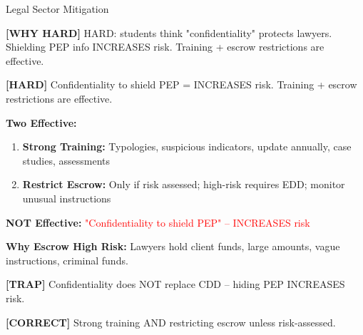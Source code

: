 \documentclass[6pt,aspectratio=169,fontsize=5pt]{beamer}
\renewcommand{\tiny}{\fontsize{3.5pt}{4.5pt}\selectfont}
\renewcommand{\normalsize}{\fontsize{7.5pt}{8.5pt}\selectfont}
\newcommand{\trap}[1]{%
	\begin{block}{\textcolor{redtrap}{\textbf{[TRAP]}}}
		\textcolor{redtrap}{\tiny #1}
	\end{block}
}
\newcommand{\correct}[1]{%
	\begin{block}{\textcolor{greencorrect}{\textbf{[CORRECT]}}}
		\textcolor{greencorrect}{\tiny #1}
	\end{block}
}
\newcommand{\hard}[1]{%
	\begin{block}{\textcolor{hardcolor}{\textbf{[HARD]}}}
		\textcolor{hardcolor}{\tiny #1}
	\end{block}
}
\newcommand{\hardexplain}[1]{%
	\begin{block}{\textcolor{orangehard}{\textbf{[WHY HARD]}}}
		\textcolor{orangehard}{\tiny #1}
	\end{block}
}
\begin{document}
	\begin{frame}{\normalsize Legal Sector Mitigation}
		
		\hardexplain{HARD: students think "confidentiality" protects lawyers. Shielding PEP info INCREASES risk. Training + escrow restrictions are effective.}
		
		\hard{Confidentiality to shield PEP = INCREASES risk. Training + escrow restrictions are effective.}
		
		\textbf{Two Effective:}
		\begin{enumerate}
			\item \textbf{Strong Training:} Typologies, suspicious indicators, update annually, case studies, assessments
			\item \textbf{Restrict Escrow:} Only if risk assessed; high-risk requires EDD; monitor unusual instructions
		\end{enumerate}
		
		\textbf{NOT Effective:} \textcolor{red}{"Confidentiality to shield PEP" -- INCREASES risk}
		
		\textbf{Why Escrow High Risk:} Lawyers hold client funds, large amounts, vague instructions, criminal funds.
		
		\trap{Confidentiality does NOT replace CDD -- hiding PEP INCREASES risk.}
		
		\correct{Strong training AND restricting escrow unless risk-assessed.}
	\end{frame}
	
\end{document}

